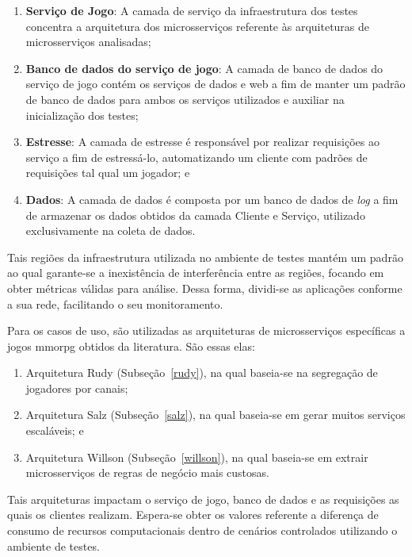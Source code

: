 \begin{enumerate}
  \item \textbf{Serviço de Jogo}: A camada de serviço da infraestrutura dos testes concentra a arquitetura dos microsserviços referente às arquiteturas de microsserviços analisadas;
  \item \textbf{Banco de dados do serviço de jogo}: A camada de banco de dados do serviço de jogo contém os serviços de dados e web a fim de manter um padrão de banco de dados para ambos os serviços utilizados e auxiliar na inicialização dos testes;
  \item \textbf{Estresse}: A camada de estresse é responsável por realizar requisições ao serviço a fim de estressá-lo, automatizando um cliente com padrões de requisições tal qual um jogador; e
  \item \textbf{Dados}: A camada de dados é composta por um banco de dados de \textit{log} a fim de armazenar os dados obtidos da camada Cliente e Serviço, utilizado exclusivamente na coleta de dados.
\end{enumerate}



Tais regiões da infraestrutura utilizada no ambiente de testes mantém um padrão ao qual garante-se a inexistência de interferência entre as regiões, focando em obter métricas válidas para análise.
%
Dessa forma, dividi-se as aplicações conforme a sua rede, facilitando o seu monitoramento.


Para os casos de uso, são utilizadas as arquiteturas de microsserviços específicas a jogos \ac{mmorpg} obtidos da literatura.
%
São essas elas:



\begin{enumerate}
  \item Arquitetura Rudy (Subseção~\ref{rudy}), na qual baseia-se na segregação de jogadores por canais;
  \item Arquitetura Salz (Subseção~\ref{salz}), na qual baseia-se em gerar muitos serviços escaláveis; e
  \item Arquitetura Willson (Subseção~\ref{willson}), na qual baseia-se em extrair microsserviços de regras de negócio mais custosas.
\end{enumerate}



Tais arquiteturas impactam o serviço de jogo, banco de dados e as requisições as quais os clientes realizam.
%
Espera-se obter os valores referente a diferença de consumo de recursos computacionais dentro de cenários controlados utilizando o ambiente de testes.



